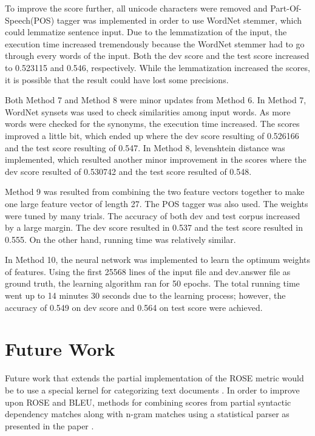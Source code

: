 \documentclass[11pt,letterpaper]{article}
\begin{document}
        To improve the score further, all unicode characters were removed and Part-Of-Speech(POS) tagger was implemented in order to use WordNet stemmer, which could lemmatize sentence input. Due to the lemmatization of the input, the execution time increased tremendously because the WordNet stemmer had to go through every words of the input. Both the dev score and the test score increased to 0.523115 and 0.546, respectively. While the lemmatization increased the scores, it is possible that the result could have lost some precisions.\par
        Both Method 7 and Method 8 were minor updates from Method 6. In Method 7, WordNet synsets was used to check similarities among input words. As more words were checked for the synonyms, the execution time increased. The scores improved a little bit, which ended up where the dev score resulting of 0.526166 and the test score resulting of 0.547. In Method 8, levenshtein distance was implemented, which resulted another minor improvement in the scores where the dev score resulted of 0.530742 and the test score resulted of 0.548.\par
        Method 9 was resulted from combining the two feature vectors together to make one large feature vector of length 27. The POS tagger was also used. The weights were tuned by many trials.  The accuracy of both dev and test corpus increased by a large margin. The dev score resulted in 0.537 and the test score resulted in 0.555. On the other hand, running time was relatively similar.\par
        In Method 10, the neural network was implemented to learn the optimum weights of features. Using the first 25568 lines of the input file and dev.answer file as ground truth, the learning algorithm ran for 50 epochs. The total running time went up to 14 minutes 30 seconds due to the learning process; however, the accuracy of 0.549 on dev score and 0.564 on test score were achieved.


\section{Future Work}
Future work that extends the partial implementation of the ROSE metric would be to use a special kernel for categorizing text documents \cite{lodhi2002text}. In order to improve upon ROSE and BLEU, methods for combining scores from partial syntactic dependency matches along with n-gram matches using a statistical parser as presented in the paper \cite{kahn2009expected}.



\end{document}
